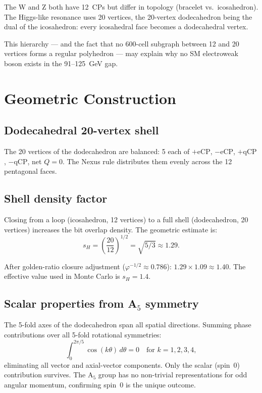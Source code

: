 \documentclass[11pt,a4paper]{article}
\newcommand{\phig}{\varphi}
\begin{document}
The W and Z both have 12~CPs but differ in topology (bracelet vs.\
icosahedron).  The Higgs-like resonance uses 20 vertices, the
20-vertex dodecahedron being the dual of the icosahedron: every
icosahedral face becomes a dodecahedral vertex.

This hierarchy --- and the fact that no 600-cell subgraph between
12 and 20 vertices forms a regular polyhedron --- may explain why
no SM electroweak boson exists in the 91--125~GeV gap.

\section{Geometric Construction}

\subsection{Dodecahedral 20-vertex shell}

The 20 vertices of the dodecahedron are balanced: 5 each of
$+\text{eCP}$, $-\text{eCP}$, $+\text{qCP}$, $-\text{qCP}$,
net $Q=0$.  The Nexus rule distributes them evenly across the 12
pentagonal faces.

\subsection{Shell density factor}

Closing from a loop (icosahedron, 12 vertices) to a full shell
(dodecahedron, 20 vertices) increases the bit overlap density.
The geometric estimate is:
\begin{equation}
s_H
= \left(\frac{20}{12}\right)^{1/2}
= \sqrt{5/3}
\approx 1.29.
\label{eq:shelldens_ideal}
\end{equation}

After golden-ratio closure adjustment ($\phig^{-1/2} \approx 0.786$):
$1.29\times 1.09 \approx 1.40$.  The effective value used in Monte
Carlo is $s_H = 1.4$.

\subsection{Scalar properties from A$_5$ symmetry}

The 5-fold axes of the dodecahedron span all spatial directions.
Summing phase contributions over all 5-fold rotational symmetries:
\begin{equation}
\int_0^{2\pi/5}\cos(k\theta)\,d\theta = 0\quad\text{for }k = 1,2,3,4,
\label{eq:scalar}
\end{equation}
eliminating all vector and axial-vector components.  Only the scalar
(spin~0) contribution survives.  The A$_5$ group has no non-trivial
representations for odd angular momentum, confirming spin~0 is the
unique outcome.
\end{document}
